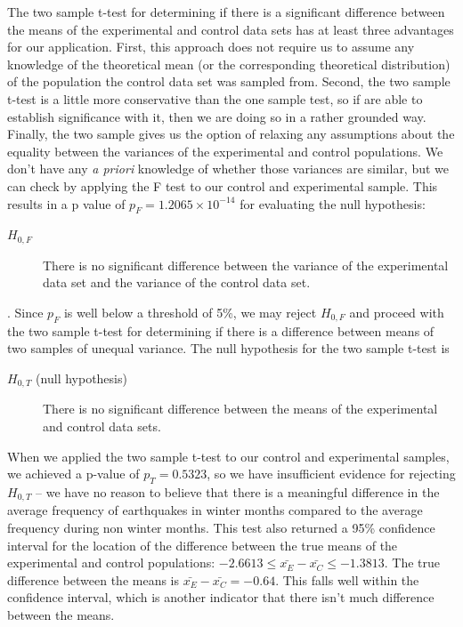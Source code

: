 \documentclass{amsart}
\begin{document}
The two sample t-test for determining if there is a significant difference between the means of the experimental and control data sets has at least three advantages for our application. First, this approach does not require us to assume any knowledge of the theoretical mean (or the corresponding theoretical distribution) of the population the control data set was sampled from. Second, the two sample t-test is a little more conservative than the one sample test, so if are able to establish significance with it, then we are doing so in a rather grounded way. Finally, the two sample gives us the option of relaxing any assumptions about the equality between the variances of the  experimental and control populations. We don't have any \textsl{a priori} knowledge of whether those variances are similar, but we can check by applying the F test to our control and experimental sample. This results in a p value of $p_F=1.2065 \times 10^{-14}$ for evaluating the null hypothesis:
\begin{description}
\item[$H_{0,F}$] There is no significant difference between the variance of the experimental data set and the variance of the control data set.
\end{description}.
Since $p_F$ is well below a threshold of 5\%, we may reject $H_{0,F}$ and proceed with the two sample t-test for determining if there is a difference between means of two samples of unequal variance. The null hypothesis for the two sample t-test is
\begin{description}
\item[$H_{0,T}$ (null hypothesis)] There is no significant difference between the means of the experimental and control data sets.
\end{description}
When we applied the two sample t-test to our control and experimental samples, we achieved a p-value of $p_T=0.5323$, so we have insufficient evidence for rejecting $H_{0,T}$ -- we have no reason to believe that there is a meaningful difference in the average frequency of earthquakes in winter months compared to the average frequency during non winter months. This test also returned a 95\% confidence interval for the location of the difference between the true means of the experimental and control populations: $-2.6613\le \bar{x_E}-\bar{x_C} \le -1.3813$.
The true difference between the means is $\bar{x_E}-\bar{x_C}=-0.64$. This falls well within the confidence interval, which is another indicator that there isn't much difference between the means.
\end{document}
